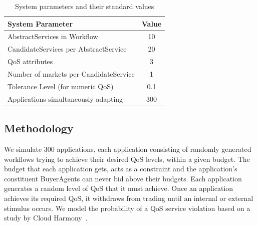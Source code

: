 \documentclass[10pt,journal,compsoc]{IEEEtran}
\begin{document}
\begin{table}[H]
\centering
	\begin{tabular}{p{6cm}c}
		\toprule
		\textbf{System Parameter} & \textbf{Value} \\ 
		\midrule
		AbstractServices in Workflow & 10 \\ 
		CandidateServices per AbstractService & 20 \\ 
		QoS attributes & 3 \\ 
		Number of markets per CandidateService & 1 \\ 
		Tolerance Level (for numeric QoS) & 0.1 \\
		Applications simultaneously adapting & 300 \\
		\bottomrule
	\end{tabular}
	\caption{System parameters and their standard values \label{tbl:standard_parameters}}
\end{table}

\subsection{Methodology}
We simulate 300 applications, each application consisting of randomly generated workflows trying to achieve their desired QoS levels, within a given budget. The budget that each application gets, acts as a constraint and the application's constituent BuyerAgents can never bid above their budgets. Each application generates a random level of QoS that it must achieve. Once an application achieves its required QoS, it withdraws from trading until an internal or external stimulus occurs. We model the probability of a QoS service violation based on a study by Cloud Harmony~\cite{2011CloudHarmonyStudy}.\\
\end{document}
